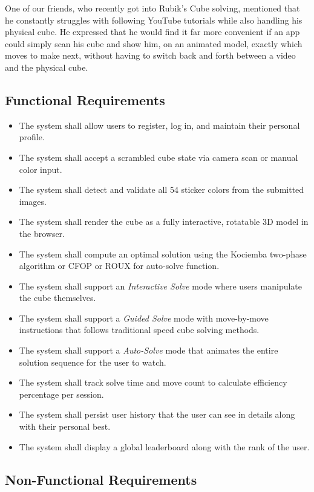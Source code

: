 \documentclass[12pt, a4paper]{article}
\begin{document}
One of our friends, who recently got into Rubik's Cube solving, mentioned that he constantly struggles with following YouTube tutorials while also handling his physical cube. He expressed that he would find it far more convenient if an app could simply scan his cube and show him, on an animated model, exactly which moves to make next, without having to switch back and forth between a video and the physical cube.

\subsection*{Functional Requirements}

\begin{itemize}[itemsep=0.5em, topsep=5pt]
    \item The system shall allow users to register, log in, and maintain their personal profile.
    \item The system shall accept a scrambled cube state via camera scan or manual color input.
    \item The system shall detect and validate all 54 sticker colors from the submitted images.
    \item The system shall render the cube as a fully interactive, rotatable 3D model in the browser.
    \item The system shall compute an optimal solution using the Kociemba two-phase algorithm or CFOP or ROUX for auto-solve function.
    \item The system shall support an \textit{Interactive Solve} mode where users manipulate the cube themselves.
    \item The system shall support a \textit{Guided Solve} mode with move-by-move instructions that follows traditional speed cube solving methods.
    \item The system shall support a \textit{Auto-Solve} mode that animates the entire solution sequence for the user to watch.
    \item The system shall track solve time and move count to calculate efficiency percentage per session.
    \item The system shall persist user history that the user can see in details along with their personal best.
    \item The system shall display a global leaderboard along with the rank of the user.
\end{itemize}

\newpage

\subsection*{Non-Functional Requirements}
\end{document}
